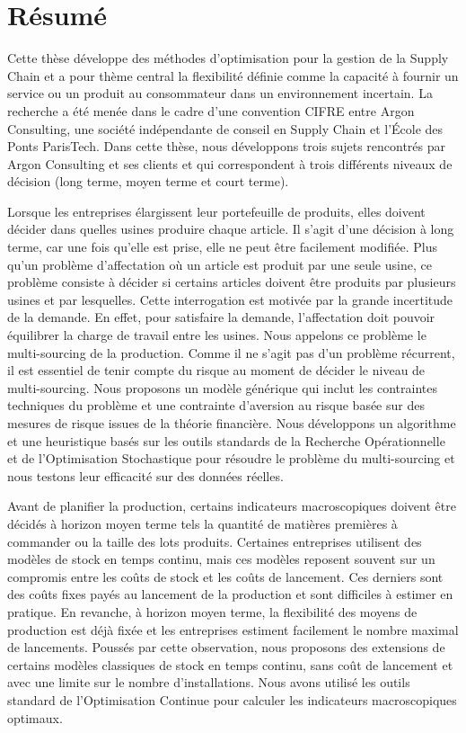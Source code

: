 \chapter*{R\'esum\'e} %
\label{cha:resume}


Cette thèse développe des méthodes d'optimisation pour la gestion de la Supply Chain et a pour thème central la flexibilité définie comme la capacité à fournir un service ou un produit au consommateur dans un environnement incertain.
La recherche a été menée dans le cadre d'une convention CIFRE entre Argon Consulting, une société indépendante de conseil en Supply Chain et l'\'Ecole des Ponts ParisTech.
Dans cette thèse, nous développons trois sujets rencontrés par Argon Consulting et ses clients et qui correspondent à trois différents niveaux de décision (long terme, moyen terme et court terme).


Lorsque les entreprises élargissent leur portefeuille de produits, elles doivent décider dans quelles usines produire chaque article.
Il s'agit d'une décision à long terme, car une fois qu'elle est prise, elle ne peut être facilement modifiée.
Plus qu'un problème d'affectation où un article est produit par une seule usine, ce problème consiste à décider si certains articles doivent être produits par plusieurs usines et par lesquelles.
Cette interrogation est motivée par la grande incertitude de la demande.
En effet, pour satisfaire la demande, l'affectation doit pouvoir équilibrer la charge de travail entre les usines.
Nous appelons ce problème le multi-sourcing de la production.
Comme il ne s'agit pas d'un problème récurrent, il est essentiel de tenir compte du risque au moment de décider le niveau de multi-sourcing.
Nous proposons un modèle générique qui inclut les contraintes techniques du problème et une contrainte d'aversion au risque basée sur des mesures de risque issues de la théorie financière.
Nous développons un algorithme et une heuristique basés sur les outils standards de la Recherche Opérationnelle et de l'Optimisation Stochastique pour résoudre le problème du multi-sourcing et nous testons leur efficacité sur des données réelles.


Avant de planifier la production, certains indicateurs macroscopiques doivent être décidés à horizon moyen terme tels la quantité de matières premières à commander ou la taille des lots produits.
Certaines entreprises utilisent des modèles de stock en temps continu, mais ces modèles reposent souvent sur un compromis entre les coûts de stock et les coûts de lancement.
Ces derniers sont des coûts fixes payés au lancement de la production et sont difficiles à estimer en pratique.
En revanche, à horizon moyen terme, la flexibilité des moyens de production est déjà fixée et les entreprises estiment facilement le nombre maximal de lancements.
Poussés par cette observation, nous proposons des extensions de certains modèles classiques de stock en temps continu, sans coût de lancement et avec une limite sur le nombre d'installations.
Nous avons utilisé les outils standard de l'Optimisation Continue pour calculer les indicateurs macroscopiques optimaux.


